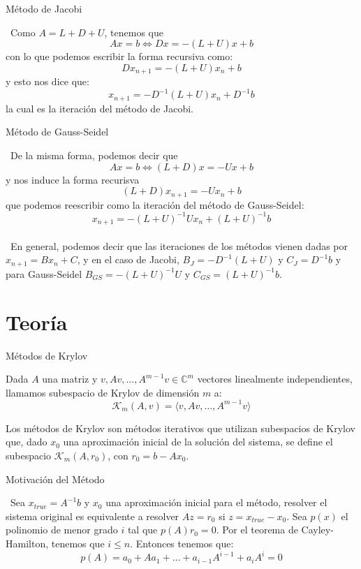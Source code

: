 \documentclass[12pt]{beamer}
\begin{document}
	\begin{frame}{Método de Jacobi}
		
		\ Como $A = L+D+U$, tenemos que $$Ax=b \iff Dx=-(L+U)x+b$$ con lo que podemos escribir la forma recursiva como: $$Dx_{n+1}=-(L+U)x_n+b$$ y esto nos dice que: $$x_{n+1}=-D^{-1}(L+U)x_n+D^{-1}b$$ la cual es la iteración del método de Jacobi.
		
	\end{frame}
	
	\begin{frame}{Método de Gauss-Seidel}
		
		\ De la misma forma, podemos decir que $$Ax=b \iff (L+D)x=-Ux+b$$ y nos induce la forma recurisva $$(L+D)x_{n+1}=-Ux_n+b$$ que podemos reescribir como la iteración del método de Gauss-Seidel: $$x_{n+1}=-(L+U)^{-1}Ux_n+(L+U)^{-1}b$$ \\
		\ En general, podemos decir que las iteraciones de los métodos vienen dadas por $x_{n+1}=Bx_n+C$, y en el caso de Jacobi, $B_J=-D^{-1}(L+U)$ y $C_J=D^{-1}b$ y para Gauss-Seidel $B_{GS}=-(L+U)^{-1}U$ y $C_{GS}=(L+U)^{-1}b$.
		
	\end{frame}
	
	\section{Teoría}
	
	\begin{frame}{Métodos de Krylov}
		
		\begin{definition}
			Dada $A$ una matriz y $v, Av, \dots , A^{m-1}v \in \mathbb{C}^m$ vectores linealmente independientes, llamamos subespacio de Krylov de dimensión $m$ a: $$\mathcal{K}_{m}(A, v) = \langle v, Av, \ldots, A^{m-1}v \rangle$$
		\end{definition} 
		Los métodos de Krylov son métodos iterativos que utilizan subespacios de Krylov que, dado $x_0$ una aproximación inicial de la solución del sistema, se define el subespacio $\mathcal{K}_{m}(A, r_0)$, con $r_0=b-Ax_0$.
		
	\end{frame}
	
	\begin{frame}{Motivación del Método}
		
		\ Sea $x_{true}=A^{-1}b$ y $x_0$ una aproximación inicial para el método, resolver el sistema original es equivalente a resolver $Az=r_0$ si $z=x_{true}-x_0$. Sea $p(x)$ el polinomio de menor grado $i$ tal que $p(A)r_0=0$. Por el teorema de Cayley-Hamilton, tenemos que $i\leq n$. Entonces tenemos que: $$p(A)=a_0+Aa_1+\dots+a_{i-1}A^{i-1}+a_iA^i=0$$ 
		
	\end{frame}
	
\end{document}
